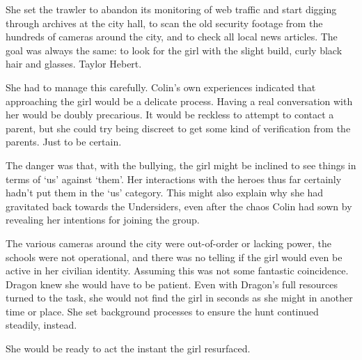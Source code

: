 She set the trawler to abandon its monitoring of web traffic and start digging through archives at the city hall, to scan the old security footage from the hundreds of cameras around the city, and to check all local news articles.  The goal was always the same: to look for the girl with the slight build, curly black hair and glasses.  Taylor Hebert.



She had to manage this carefully.  Colin's own experiences indicated that approaching the girl would be a delicate process.  Having a real conversation with her would be doubly precarious. It would be reckless to attempt to contact a parent, but she could try being discreet to get some kind of verification from the parents.  Just to be certain.



The danger was that, with the bullying, the girl might be inclined to see things in terms of `us' against `them'.  Her interactions with the heroes thus far certainly hadn't put them in the `us' category.  This might also explain why she had gravitated back towards the Undersiders, even after the chaos Colin had sown by revealing her intentions for joining the group.



The various cameras around the city were out-of-order or lacking power, the schools were not operational, and there was no telling if the girl would even be active in her civilian identity.  Assuming this was not some fantastic coincidence.  Dragon knew she would have to be patient.  Even with Dragon's full resources turned to the task, she would not find the girl in seconds as she might in another time or place.  She set background processes to ensure the hunt continued steadily, instead.



She would be ready to act the instant the girl resurfaced.





